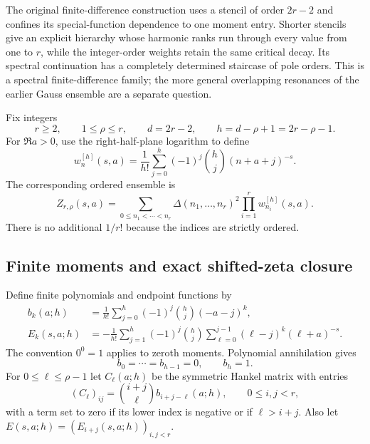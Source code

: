 \documentclass[11pt]{article}
\theoremstyle{definition}
\theoremstyle{remark}
\numberwithin{equation}{section}
\begin{document}
The original finite-difference construction uses a stencil of order
$2r-2$ and confines its special-function dependence to one moment entry.
Shorter stencils give an explicit hierarchy whose harmonic ranks run
through every value from one to $r$, while the integer-order weights
retain the same critical decay.  Its spectral continuation has a
completely determined staircase of pole orders.  This is a spectral
finite-difference family; the more general overlapping resonances of
the earlier Gauss ensemble are a separate question.

Fix integers
\begin{equation}\label{hier:parameters}
 r\ge2,\qquad 1\le\rho\le r,\qquad
 d=2r-2,\qquad h=d-\rho+1=2r-\rho-1.
\end{equation}
For $\Re a>0$, use the right-half-plane logarithm to define
\begin{equation}\label{hier:weight}
 w_n^{[h]}(s,a)=\frac1{h!}\sum_{j=0}^h(-1)^j\binom hj
                                      (n+a+j)^{-s}.
\end{equation}
The corresponding ordered ensemble is
\begin{equation}\label{hier:ensemble}
 Z_{r,\rho}(s,a)=
 \sum_{0\le n_1<\cdots<n_r}
 \Delta(n_1,\ldots,n_r)^2\prod_{i=1}^r w_{n_i}^{[h]}(s,a).
\end{equation}
There is no additional $1/r!$ because the indices are strictly ordered.

\subsection{Finite moments and exact shifted-zeta closure}

Define finite polynomials and endpoint functions by
\begin{align}
 b_k(a;h)&=\frac1{h!}\sum_{j=0}^h(-1)^j\binom hj(-a-j)^k,
                                                        \label{hier:b}\\
 E_k(s,a;h)&=-\frac1{h!}\sum_{j=1}^h(-1)^j\binom hj
       \sum_{\ell=0}^{j-1}(\ell-j)^k(\ell+a)^{-s}.
                                                        \label{hier:E}
\end{align}
The convention $0^0=1$ applies to zeroth moments.  Polynomial
annihilation gives
\begin{equation}\label{hier:annihilation}
 b_0=\cdots=b_{h-1}=0,\qquad b_h=1.
\end{equation}
For $0\le\ell\le\rho-1$ let $C_\ell(a;h)$ be the symmetric Hankel
matrix with entries
\begin{equation}\label{hier:C}
 (C_\ell)_{ij}=\binom{i+j}{\ell}b_{i+j-\ell}(a;h),
 \qquad 0\le i,j<r,
\end{equation}
with a term set to zero if its lower index is negative or if
$\ell>i+j$.  Also let $E(s,a;h)=(E_{i+j}(s,a;h))_{i,j<r}$.
\end{document}
